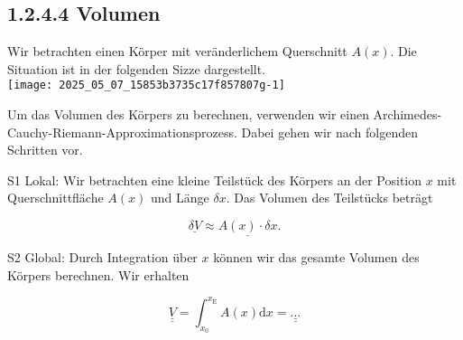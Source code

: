 \documentclass[10pt]{article}
\begin{document}
\subsection*{1.2.4.4 Volumen}
Wir betrachten einen Körper mit veränderlichem Querschnitt $A(x)$. Die Situation ist in der folgenden Sizze dargestellt.\\
\texttt{[image: 2025\_05\_07\_15853b3735c17f857807g-1]}

Um das Volumen des Körpers zu berechnen, verwenden wir einen Archimedes-Cauchy-Riemann-Approximationsprozess. Dabei gehen wir nach folgenden Schritten vor.

S1 Lokal: Wir betrachten eine kleine Teilstück des Körpers an der Position $x$ mit Querschnittfläche $A(x)$ und Länge $\delta x$. Das Volumen des Teilstücks beträgt


\begin{equation*}
\underline{\delta V} \approx \underline{A(x) \cdot \delta x} . \tag{1.18}
\end{equation*}


S2 Global: Durch Integration über $x$ können wir das gesamte Volumen des Körpers berechnen. Wir erhalten


\begin{equation*}
\underline{\underline{V}}=\int_{x_{0}}^{x_{\mathrm{E}}} A(x) \mathrm{d} x=\underline{\underline{\ldots}} \tag{1.19}
\end{equation*}
\end{document}
